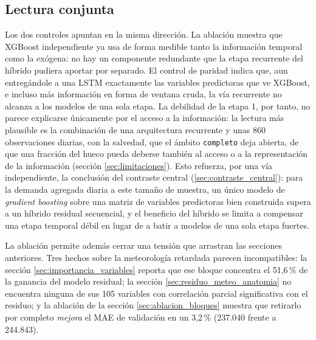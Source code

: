 \subsection{Lectura conjunta}\label{sec:lectura_conjunta}

Los dos controles apuntan en la misma dirección. La ablación muestra que
XGBoost independiente ya usa de forma medible tanto la información temporal como la
exógena: no hay un componente redundante que la etapa recurrente del híbrido pudiera
aportar por separado. El control de paridad indica que, aun entregándole a una LSTM
exactamente las variables predictoras que ve XGBoost, e incluso más información en forma de
ventana cruda, la vía recurrente no alcanza a los modelos de una sola etapa. La debilidad
de la etapa 1, por tanto, no parece explicarse únicamente por el acceso a la
información: la lectura más plausible es la combinación de una arquitectura recurrente y
unas 860 observaciones diarias, con la salvedad, que el ámbito \texttt{completo} deja
abierta, de que una fracción del hueco pueda deberse también al acceso o a la
representación de la información (sección \ref{sec:limitaciones}).
Esto refuerza, por una vía independiente, la conclusión del contraste central
(\ref{sec:contraste_central}): para la demanda agregada diaria a este tamaño de muestra, un
único modelo de \emph{gradient boosting} sobre una matriz de variables predictoras bien
construida supera a
un híbrido residual secuencial, y el beneficio del híbrido se limita a compensar una etapa
temporal débil en lugar de a batir a modelos de una sola etapa fuertes.

La ablación permite además cerrar una tensión que arrastran las secciones anteriores.
Tres hechos sobre la meteorología retardada parecen
incompatibles: la sección \ref{sec:importancia_variables} reporta que ese bloque concentra
el 51,6\,\% de la ganancia del modelo residual; la sección
\ref{sec:residuo_meteo_anatomia} no encuentra ninguna de sus 105 variables con correlación
parcial significativa con el residuo; y la ablación de la sección
\ref{sec:ablacion_bloques} muestra que retirarlo por completo \emph{mejora} el MAE de
validación en un 3,2\,\% (237.040 frente a 244.843).

